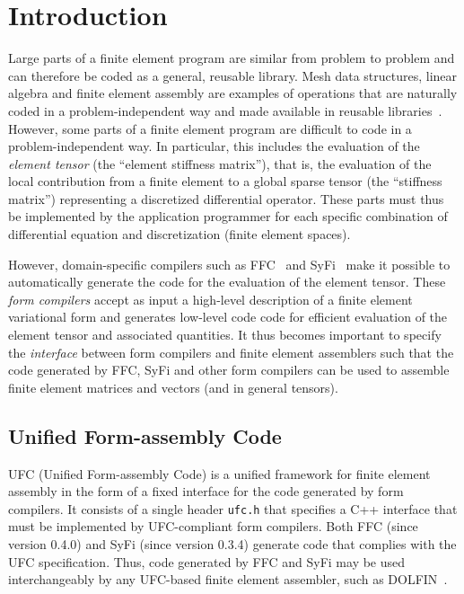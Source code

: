 \chapter{Introduction}
\label{sec:introduction}

Large parts of a finite element program are similar from problem to
problem and can therefore be coded as a general, reusable library.
Mesh data structures, linear algebra and finite element assembly are
examples of operations that are naturally coded in a
problem-independent way and made available in reusable
libraries~\cite{www:fenics,www:petsc,www:sundance,www:deal.II,www:trilinos,www:diffpack}.
However, some parts of a finite element program are difficult to code
in a problem-independent way. In particular, this includes the
evaluation of the \emph{element tensor} (the ``element stiffness
matrix''), that is, the evaluation of the local contribution from a
finite element to a global sparse tensor (the ``stiffness matrix'')
representing a discretized differential operator. These parts must
thus be implemented by the application programmer for each specific
combination of differential equation and discretization (finite
element spaces).

However, domain-specific compilers such as
FFC~\cite{www:ffc,logg:article:07,logg:article:09,logg:article:10,logg:article:11}
and SyFi~\cite{www:syfi} make it possible to automatically generate
the code for the evaluation of the element tensor. These \emph{form
compilers} accept as input a high-level description of a finite
element variational form and generates low-level code code for
efficient evaluation of the element tensor and associated quantities.
It thus becomes important to specify the \emph{interface} between form
compilers and finite element assemblers such that the code generated
by FFC, SyFi and other form compilers can be used to assemble finite
element matrices and vectors (and in general tensors).

\section{Unified Form-assembly Code}

UFC (Unified Form-assembly Code) is a unified framework for finite
element assembly in the form of a fixed interface for the code
generated by form compilers. It consists of a single header
\texttt{ufc.h} that specifies a C++ interface that must be implemented
by UFC-compliant form compilers. Both FFC (since version 0.4.0) and
SyFi (since version 0.3.4) generate code that complies with the UFC
specification. Thus, code generated by FFC and SyFi may be used
interchangeably by any UFC-based finite element assembler, such as
DOLFIN~\cite{www:dolfin}.

